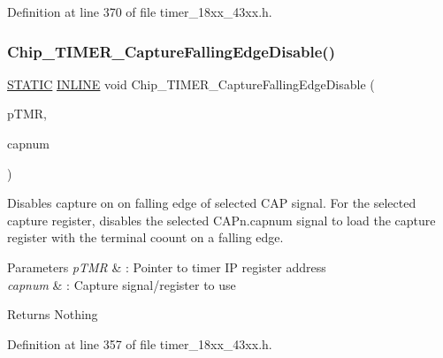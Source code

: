 Definition at line 370 of file timer\+\_\+18xx\+\_\+43xx.\+h.

\mbox{\label{group___t_i_m_e_r__18_x_x__43_x_x_ga521a3308abdffb693f4785b739dae98f}} 
\subsubsection{\texorpdfstring{Chip\+\_\+\+T\+I\+M\+E\+R\+\_\+\+Capture\+Falling\+Edge\+Disable()}{Chip\_TIMER\_CaptureFallingEdgeDisable()}}
{\footnotesize\ttfamily \hyperlink{group___l_p_c___types___public___macros_ga10b2d890d871e1489bb02b7e70d9bdfb}{S\+T\+A\+T\+IC} \hyperlink{spifi__18xx__43xx_8h_a2eb6f9e0395b47b8d5e3eeae4fe0c116}{I\+N\+L\+I\+NE} void Chip\+\_\+\+T\+I\+M\+E\+R\+\_\+\+Capture\+Falling\+Edge\+Disable (\begin{DoxyParamCaption}\item[{\hyperlink{struct_l_p_c___t_i_m_e_r___t}{L\+P\+C\+\_\+\+T\+I\+M\+E\+R\+\_\+T} $\ast$}]{p\+T\+MR,  }\item[{int8\+\_\+t}]{capnum }\end{DoxyParamCaption})}



Disables capture on on falling edge of selected C\+AP signal. For the selected capture register, disables the selected C\+A\+Pn.\+capnum signal to load the capture register with the terminal coount on a falling edge. 


\begin{DoxyParams}{Parameters}
{\em p\+T\+MR} & \+: Pointer to timer IP register address \\
\hline
{\em capnum} & \+: Capture signal/register to use \\
\hline
\end{DoxyParams}
\begin{DoxyReturn}{Returns}
Nothing 
\end{DoxyReturn}


Definition at line 357 of file timer\+\_\+18xx\+\_\+43xx.\+h.

